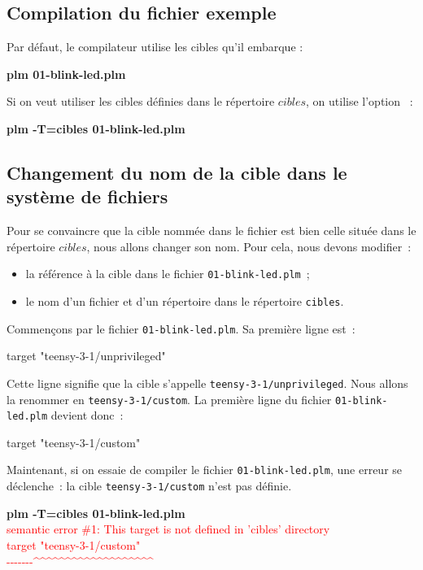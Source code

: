 \subsection{Compilation du fichier exemple}
Par défaut, le compilateur utilise les cibles qu'il embarque :
\begin{SHELL}
\bfseries plm 01-blink-led.plm
\end{SHELL}

Si on veut utiliser les cibles définies dans le répertoire $cibles$, on utilise l'option ~:
\begin{SHELL}
\bfseries plm -T=cibles 01-blink-led.plm
\end{SHELL}


\subsection{Changement du nom de la cible dans le système de fichiers}

Pour se convaincre que la cible nommée dans le fichier est bien celle située dans le répertoire $cibles$, nous allons changer son nom. Pour cela, nous devons modifier~:
\begin{itemize}
  \item la référence à la cible dans le fichier \texttt{01-blink-led.plm}~;
  \item le nom d'un fichier et d'un répertoire dans le répertoire \texttt{cibles}. 
\end{itemize}

Commençons par le fichier \texttt{01-blink-led.plm}. Sa première ligne est~:

\begin{PLM}
target "teensy-3-1/unprivileged"
\end{PLM}

Cette ligne signifie que la cible s'appelle \texttt{teensy-3-1/unprivileged}. Nous allons la renommer en \texttt{teensy-3-1/custom}. La première ligne du fichier \texttt{01-blink-led.plm} devient donc~:

\begin{PLM}
target "teensy-3-1/custom"
\end{PLM}

Maintenant, si on essaie de compiler le fichier \texttt{01-blink-led.plm}, une erreur se déclenche~: la cible \texttt{teensy-3-1/custom} n'est pas définie.
\begin{SHELL}
{\bfseries plm -T=cibles 01-blink-led.plm}\\
\textcolor{red}{semantic error \#1: This target is not defined in 'cibles' directory}\\
\textcolor{red}{target "teensy-3-1/custom"}\\
\textcolor{red}{-{}-{}-{}-{}-{}-{}-\^{}\^{}\^{}\^{}\^{}\^{}\^{}\^{}\^{}\^{}\^{}\^{}\^{}\^{}\^{}\^{}\^{}\^{}\^{}}
\end{SHELL}



